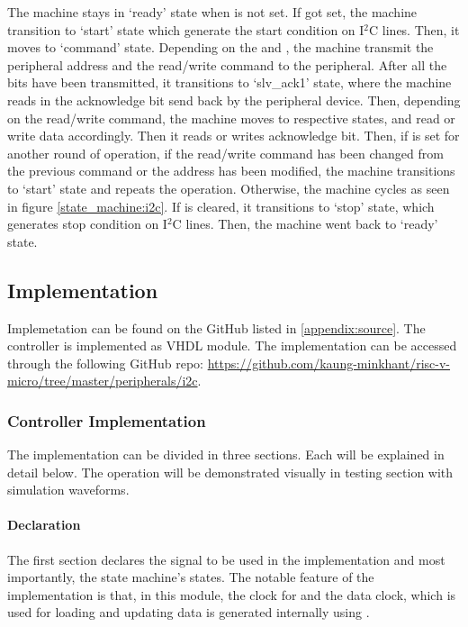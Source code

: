 
\newpage
The machine stays in `ready' state when  is not set. If  got set, the machine transition to `start' state which generate the start condition on I$^2$C lines. Then, it moves to `command' state. Depending on the  and , the machine transmit the peripheral address and the read/write command to the peripheral. After all the bits have been transmitted, it transitions to `slv\_ack1' state, where the machine reads in the acknowledge bit send back by the peripheral device. Then, depending on the read/write command, the machine moves to respective states, and read or write data accordingly. Then it reads or writes acknowledge bit. Then, if  is set for another round of operation, if the read/write command has been changed from the previous command or the address has been modified, the machine transitions to `start' state and repeats the operation. Otherwise, the machine cycles as seen in figure \ref{state_machine:i2c}. If  is cleared, it transitions to `stop' state, which generates stop condition on I$^2$C lines. Then, the machine went back to `ready' state.

\subsection{Implementation}

Implemetation can be found on the GitHub listed in \ref{appendix:source}.
The controller is implemented as VHDL module. The implementation can be accessed through the following GitHub repo: \url{https://github.com/kaung-minkhant/risc-v-micro/tree/master/peripherals/i2c}.

\subsubsection{Controller Implementation}
The implementation can be divided in three sections. Each will be explained in detail below. The operation will be demonstrated visually in testing section with simulation waveforms.

\paragraph*{Declaration}
The first section declares the signal to be used in the implementation and most importantly, the state machine's states. The notable feature of the implementation is that, in this module, the clock for  and the data clock, which is used for loading and updating data is generated internally using .

